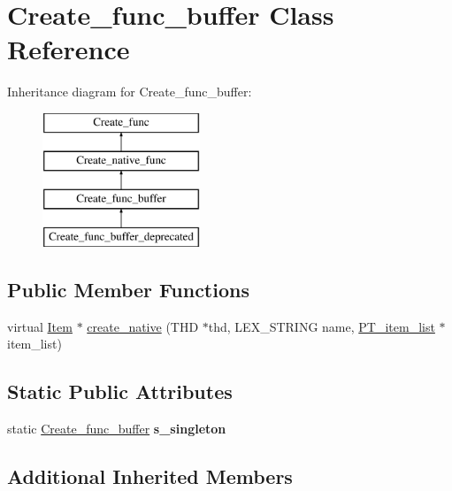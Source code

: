 \hypertarget{classCreate__func__buffer}{}\section{Create\+\_\+func\+\_\+buffer Class Reference}
\label{classCreate__func__buffer}
Inheritance diagram for Create\+\_\+func\+\_\+buffer\+:\begin{figure}[H]
\begin{center}
\leavevmode
\includegraphics[height=4.000000cm]{classCreate__func__buffer}
\end{center}
\end{figure}
\subsection*{Public Member Functions}
\begin{DoxyCompactItemize}
\item 
virtual \mbox{\hyperlink{classItem}{Item}} $\ast$ \mbox{\hyperlink{classCreate__func__buffer_afc9659d40eb597f6c6a3b1e09478767a}{create\+\_\+native}} (T\+HD $\ast$thd, L\+E\+X\+\_\+\+S\+T\+R\+I\+NG name, \mbox{\hyperlink{classPT__item__list}{P\+T\+\_\+item\+\_\+list}} $\ast$item\+\_\+list)
\end{DoxyCompactItemize}
\subsection*{Static Public Attributes}
\begin{DoxyCompactItemize}
\item 
\mbox{\label{classCreate__func__buffer_ad51e3e80682be339a773054b5682e75d}} 
static \mbox{\hyperlink{classCreate__func__buffer}{Create\+\_\+func\+\_\+buffer}} {\bfseries s\+\_\+singleton}
\end{DoxyCompactItemize}
\subsection*{Additional Inherited Members}


